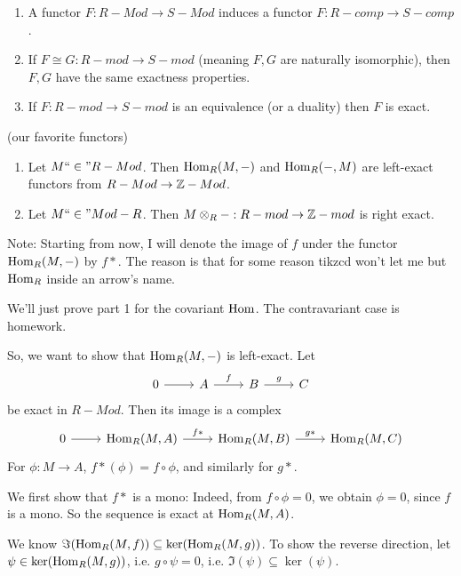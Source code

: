 \documentclass[x11names,reqno,14pt]{extarticle}
\newcommand{\fin}{``\in"}
\begin{document}
\rem 

\begin{enumerate}

\item A functor $F:R-Mod\to S-Mod$ induces a functor $F:R-comp\to S-comp$. 

\item If $F \cong G:R-mod\to S-mod$ (meaning $F, G$ are naturally isomorphic), then $F, G$ have the same exactness properties. 

\item If $F:R-mod\to S-mod$ is an equivalence (or a duality) then $F$ is exact. 

\end{enumerate}

\thm (our favorite functors)

\begin{enumerate}

\item Let $M\fin R-Mod$. Then ${\mathrm{Hom}}_R(M, -)$ and ${\mathrm{Hom}}_R(-, M)$ are left-exact functors from $R-Mod\to\mathbb{Z}-Mod$. 

\item Let $M\fin Mod-R$. Then $M\otimes_R-:R-mod\to\mathbb{Z}-mod$ is right exact.

\end{enumerate}

\proof

Note: Starting from now, I will denote the image of $f$ under the functor ${\mathrm{Hom}}_R(M, -)$ by $f*$. The reason is that for some reason tikzcd won't let me but ${\mathrm{Hom}}_R$ inside an arrow's name. 

We'll just prove part 1 for the covariant ${\mathrm{Hom}}$. The contravariant case is homework. 

So, we want to show that ${\mathrm{Hom}}_R(M, -)$ is left-exact. Let
\[
\begin{tikzcd}
0 \ar[r] & A\ar[r, "f"] & B \ar[r, "g"] & C
\end{tikzcd}
\]
be exact in $R-Mod$. Then its image is a complex
\[
\begin{tikzcd}
0 \ar[r] & \Hom_R(M,A)\ar[r, "f*"] & \Hom_R(M,B) \ar[r, "g*"] & \Hom_R(M, C)
\end{tikzcd}
\]
For $\phi:M\to A$, $f*(\phi) = f\circ \phi$, and similarly for $g*$. 

We first show that $f*$ is a mono: Indeed, from $f \circ \phi = 0$, we obtain $\phi = 0$, since $f$ is a mono. So the sequence is exact at ${\mathrm{Hom}}_R(M, A)$. 

We know $\Im({\mathrm{Hom}}_R(M, f)) \subseteq \ker({\mathrm{Hom}}_R(M, g))$. To show the reverse direction, let $\psi\in\ker({\mathrm{Hom}}_R(M, g))$, i.e. $g \circ \psi = 0$, i.e. $\Im(\psi)\subseteq\ker(\psi)$. 
\end{document}
